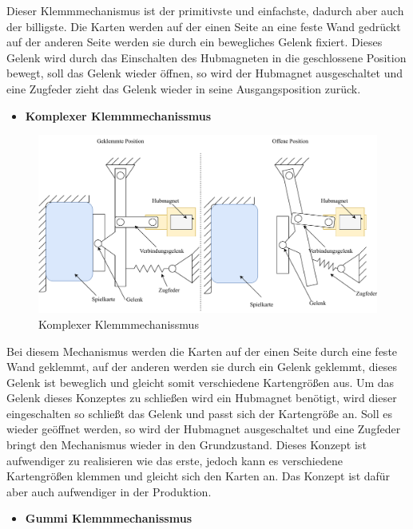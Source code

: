 Dieser Klemmmechanismus ist der primitivste und einfachste, dadurch aber auch der billigste. Die Karten werden auf der einen Seite an eine feste Wand gedrückt
auf der anderen Seite werden sie durch ein bewegliches Gelenk fixiert. Dieses Gelenk wird durch das Einschalten des Hubmagneten in die geschlossene Position bewegt,
soll das Gelenk wieder öffnen, so wird der Hubmagnet ausgeschaltet und eine Zugfeder zieht das Gelenk wieder in seine Ausgangsposition zurück.

\begin{itemize}
    \item \textbf{Komplexer Klemmmechanissmus}
\end{itemize}

\begin{figure}[H]
    \centering
    \includegraphics[scale=0.9,page=1]{fig/mech/Klemmmechanissmus2}
    \caption{Komplexer Klemmmechanissmus}
\end{figure}

Bei diesem Mechanismus werden die Karten auf der einen Seite durch eine feste Wand geklemmt, auf der anderen werden sie durch ein Gelenk geklemmt, dieses Gelenk
ist beweglich und gleicht somit verschiedene Kartengrößen aus. Um das Gelenk dieses Konzeptes zu schließen wird ein Hubmagnet benötigt, wird dieser eingeschalten
so schließt das Gelenk und passt sich der Kartengröße an. Soll es wieder geöffnet werden, so wird der Hubmagnet ausgeschaltet und eine Zugfeder bringt den Mechanismus wieder in den
Grundzustand. Dieses Konzept ist aufwendiger zu realisieren wie das erste, jedoch kann es verschiedene Kartengrößen klemmen und gleicht sich den Karten an. Das Konzept ist
dafür aber auch aufwendiger in der Produktion.

\begin{itemize}
    \item \textbf{Gummi Klemmmechanissmus}
\end{itemize}

